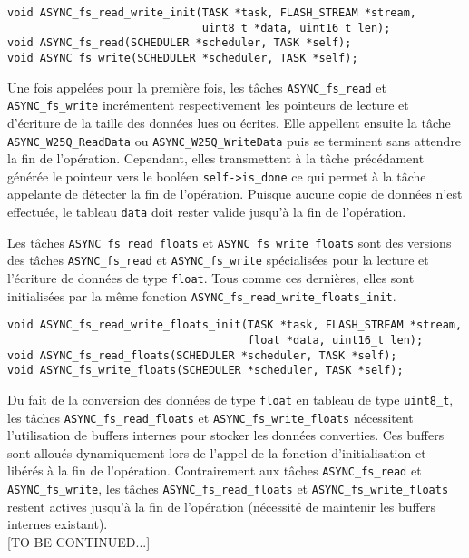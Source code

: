 \begin{lstlisting}[style=prog, frame=shadowbox, label={lst:fs_rw},
    emph={[1]ASYNC_fs_read_write_init, ASYNC_fs_read, ASYNC_fs_write}, emphstyle={[1]\color{C}},
    emph={[2]FLASH_STREAM, TASK, SCHEDULER}, emphstyle={[2]\color{E}}]
void ASYNC_fs_read_write_init(TASK *task, FLASH_STREAM *stream,
                              uint8_t *data, uint16_t len);
void ASYNC_fs_read(SCHEDULER *scheduler, TASK *self);
void ASYNC_fs_write(SCHEDULER *scheduler, TASK *self);
\end{lstlisting}

Une fois appelées pour la première fois, les tâches \texttt{ASYNC\_fs\_read} et
\texttt{ASYNC\_fs\_write} incrémentent respectivement les pointeurs de lecture et
d'écriture de la taille des données lues ou écrites. Elle appellent ensuite la
tâche \texttt{ASYNC\_W25Q\_ReadData} ou \texttt{ASYNC\_W25Q\_WriteData} puis se
terminent sans attendre la fin de l'opération. Cependant, elles transmettent à
la tâche précédament générée le pointeur vers le booléen \texttt{self->is\_done}
ce qui permet à la tâche appelante de détecter la fin de l'opération. Puisque aucune
copie de données n'est effectuée, le tableau \texttt{data} doit rester valide
jusqu'à la fin de l'opération.

\newpage


Les tâches \texttt{ASYNC\_fs\_read\_floats} et \texttt{ASYNC\_fs\_write\_floats}
sont des versions des tâches \texttt{ASYNC\_fs\_read} et \texttt{ASYNC\_fs\_write}
spécialisées pour la lecture et l'écriture de données de type \texttt{float}. Tous
comme ces dernières, elles sont initialisées par la même fonction
\texttt{ASYNC\_fs\_read\_write\_floats\_init}.\\

\begin{lstlisting}[style=prog, frame=shadowbox, label={lst:fs_rw_floats},
    emph={[1]ASYNC_fs_read_write_floats_init, ASYNC_fs_write_floats, ASYNC_fs_read_floats}, emphstyle={[1]\color{C}},
    emph={[2]FLASH_STREAM, TASK, SCHEDULER}, emphstyle={[2]\color{E}}]
void ASYNC_fs_read_write_floats_init(TASK *task, FLASH_STREAM *stream,
                                     float *data, uint16_t len);
void ASYNC_fs_read_floats(SCHEDULER *scheduler, TASK *self);
void ASYNC_fs_write_floats(SCHEDULER *scheduler, TASK *self);
\end{lstlisting}

Du fait de la conversion des données de type \texttt{float} en tableau de type
\texttt{uint8\_t}, les tâches \texttt{ASYNC\_fs\_read\_floats} et
\texttt{ASYNC\_fs\_write\_floats} nécessitent l'utilisation de buffers internes
pour stocker les données converties. Ces buffers sont alloués dynamiquement lors
de l'appel de la fonction d'initialisation et libérés à la fin de l'opération.
Contrairement aux tâches \texttt{ASYNC\_fs\_read} et \texttt{ASYNC\_fs\_write},
les tâches \texttt{ASYNC\_fs\_read\_floats} et \texttt{ASYNC\_fs\_write\_floats}
restent actives jusqu'à la fin de l'opération (nécessité de maintenir les buffers
internes existant).\\

[TO BE CONTINUED...]
